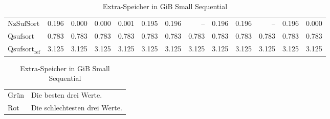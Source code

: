 \begin{table}[ht]
{\begin{tabular}{lrrrrrrrrrrrr}
    $\text{NzSufSort}$ & 0.196 & {\color{green!60!black}0.000} & {\color{green!60!black}0.000} & 0.001 & 0.195 & 0.196 & {\color{darkgray}--} & 0.196 & 0.196 & {\color{darkgray}--} & 0.196 & 0.000 \\
    $\text{Qsufsort}$ & 0.783 & 0.783 & 0.783 & 0.783 & 0.783 & 0.783 & 0.783 & 0.783 & 0.783 & 0.783 & 0.783 & 0.783 \\
    $\text{Qsufsort}_{\text{ref}}$ & 3.125 & 3.125 & 3.125 & 3.125 & 3.125 & 3.125 & 3.125 & 3.125 & 3.125 & 3.125 & 3.125 & 3.125 \\
\bottomrule
\end{tabular}
}
\caption{Extra-Speicher in GiB Small Sequential}
\label{messung:tab:memory-small-seq-none}
\begin{tabular}{ll}
{\color{green}Grün} & Die besten drei Werte.\\
{\color{red}Rot} & Die schlechtesten drei Werte.\\
\end{tabular}
\end{table}

